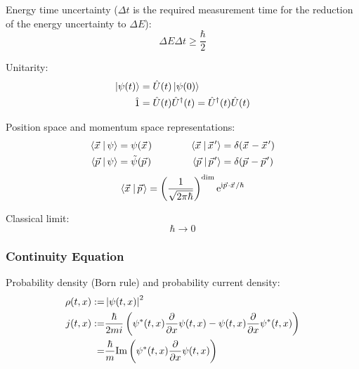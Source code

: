 		\noindent
		Energy time uncertainty ($\Delta t$ is the required measurement time for the reduction of the energy uncertainty to $\Delta E$):
		\begin{equation}
			\Delta E \Delta t \ge \frac{\hbar}{2}
		\end{equation}

		\noindent
		Unitarity:
		\begin{equation}
			\begin{aligned}
				\Ket{\psi(t)} &= \hat{U}(t) \Ket{\psi(0)} \\
				\hat{1} &= \hat{U}(t)\hat{U}^\dagger(t) = \hat{U}^\dagger(t)\hat{U}(t) \\
			\end{aligned}
		\end{equation}

		\noindent
		Position space and momentum space representations:
		\begin{equation}
			\begin{aligned}
				\Braket{\vec{x} | \psi} &= \psi(\vec{x}) &\hsp
				\Braket{\vec{x} | \vec{x}'} &= \delta(\vec{x} - \vec{x}') \\
				\Braket{\vec{p} | \psi} &= \tilde{\psi}(\vec{p}) &\hsp
				\Braket{\vec{p} | \vec{p}'} &= \delta(\vec{p} - \vec{p}') \\
			\end{aligned}
		\end{equation}
		\begin{equation}
			\begin{aligned}
				\Braket{\vec{x} | \vec{p}} &= \left( \frac{1}{\sqrt{2\pi\hbar}} \right)^\mathrm{dim} \ex^{\i \vec{p}\cdot\vec{x} / \hbar} \\
			\end{aligned}
		\end{equation}

		\noindent
		Classical limit:
		\begin{equation}
			\hbar \to 0
		\end{equation}

		\subsubsection{Continuity Equation}
			\noindent
			Probability density (Born rule) and probability current density:
			\begin{equation}
				\begin{aligned}
					\rho(t,x) :=& \left|\psi(t,x)\right|^2 \\
					j(t,x) :=& \frac{\hbar}{2mi}\left(
					\psi^*(t,x)\pdv{x}\psi(t,x) - \psi(t,x)\pdv{x}\psi^*(t,x)
					\right) \\
					=& \frac{\hbar}{m} \mathrm{Im}\left(
					\psi^*(t,x) \pdv{x}\psi(t,x)
					\right)\\
				\end{aligned}
			\end{equation}

